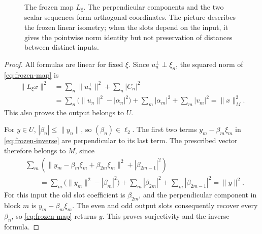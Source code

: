 \begin{figure}[ht]
\centering

\caption{The frozen map \(L_\xi\). The perpendicular components and
the two scalar sequences form orthogonal coordinates. The picture
describes the frozen linear isometry; when the slots depend on the
input, it gives the pointwise norm identity but not preservation of
distances between distinct inputs.}
\label{fig:slots}
\end{figure}


\begin{proof}
All formulas are linear for fixed \(\xi\). Since
\(u_n^\perp\perp\xi_n\), the squared norm of \eqref{eq:frozen-map}
is
\begin{align*}
 \|L_\xi x\|^2
 &=\sum_n\|u_n^\perp\|^2+\sum_n|C_n|^2\\
 &=\sum_n\bigl(\|u_n\|^2-|\alpha_n|^2\bigr)
       +\sum_m|\alpha_m|^2+\sum_m|v_m|^2
 =\|x\|_M^2.
\end{align*}
This also proves the output belongs to \(U\).

For \(y\in U\), \(|\beta_n|\le\|y_n\|\), so
\((\beta_n)\in\ell_2\). The first two terms
\(y_m-\beta_m\xi_m\) in \eqref{eq:frozen-inverse} are perpendicular
to its last term. The prescribed vector therefore belongs to \(M\),
since
\begin{align*}
 &\sum_m\left(\|y_m-\beta_m\xi_m+\beta_{2m}\xi_m\|^2
                   +|\beta_{2m-1}|^2\right)\\
 &\qquad=\sum_m\bigl(\|y_m\|^2-|\beta_m|^2\bigr)
                 +\sum_m|\beta_{2m}|^2+\sum_m|\beta_{2m-1}|^2
 =\|y\|^2.
\end{align*}
For this input the old slot coefficient is \(\beta_{2m}\), and the
perpendicular component in block \(m\) is \(y_m-\beta_m\xi_m\).
The even and odd output slots consequently recover every \(\beta_n\),
so \eqref{eq:frozen-map} returns \(y\). This proves surjectivity and
the inverse formula.
\end{proof}

